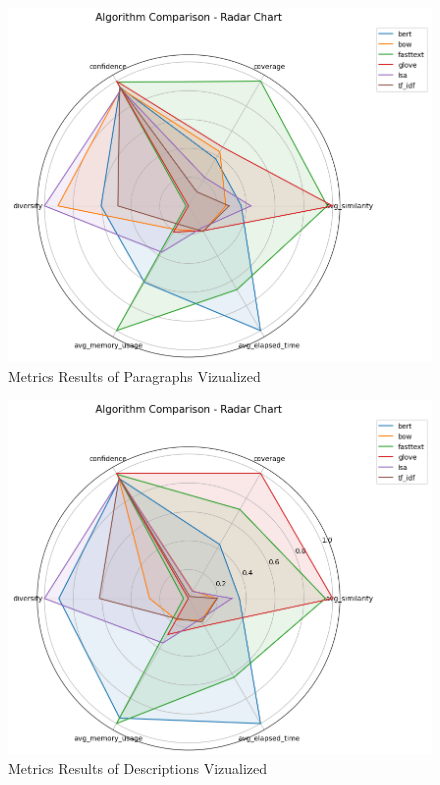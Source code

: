\documentclass[\myFontSize,a4paper,oneside,english,hidelinks]{article}
\begin{document}
\begin{figure}[h!]
    \centering
    \includegraphics[width=1\textwidth]{img/paragraphs_radarchart.png}
    \caption{Metrics Results of Paragraphs Vizualized}
    \label{fig:paragraphs_radar}
\end{figure}


\begin{figure}[h!]
    \centering
    \includegraphics[width=1\textwidth]{img/descriptions_radarchart.png}
    \caption{Metrics Results of Descriptions Vizualized}
    \label{fig:descriptions_radar}
\end{figure}
\end{document}
